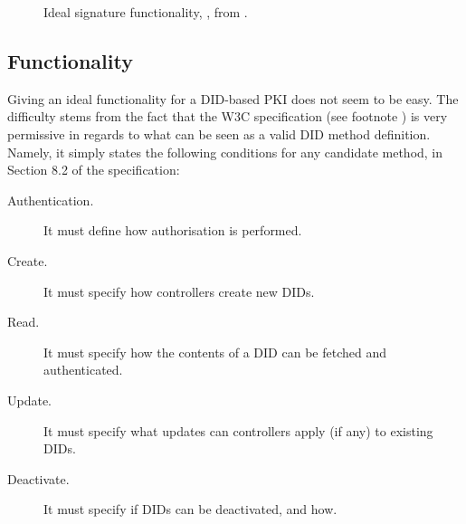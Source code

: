 \begin{figure}
\begin{framed}
\begin{minipage}[t]{0.5\textwidth}
{      }
    \end{minipage}
    \begin{minipage}[t]{0.5\textwidth}
    \end{minipage}
  \end{framed}
  \caption{Ideal signature functionality, \IdealFSig, from \cite{canetti03}.}
  \label{fig:faobb}
\end{figure}

\subsection{Functionality \IdealFPKIDID}

Giving an ideal functionality for a DID-based PKI does not seem to be easy. The
difficulty stems from the fact that the W3C specification (see footnote
) is very permissive in regards to what can be seen as a valid DID
method definition. Namely, it simply states the following conditions for any
candidate method, in Section 8.2 of the specification:

\begin{description}
\item[Authentication.] It must define how authorisation is performed.  
\item[Create.] It must specify how controllers create new DIDs.
\item[Read.] It must specify how the contents of a DID can be fetched and
  authenticated.
\item[Update.] It must specify what updates can controllers apply (if any)
  to existing DIDs.
\item[Deactivate.] It must specify if DIDs can be deactivated, and how.
\end{description}

